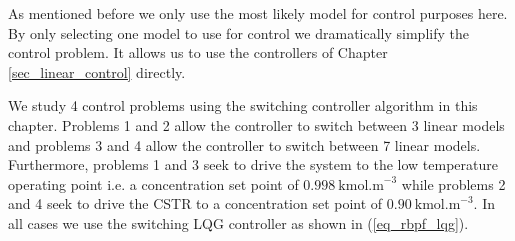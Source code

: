 As mentioned before we only use the most likely model for control purposes here. By only selecting one model to use for control we dramatically simplify the control problem. It allows us to use the controllers of Chapter \ref{sec_linear_control} directly. 

We study 4 control problems using the switching controller algorithm in this chapter. Problems 1 and 2 allow the controller to switch between 3 linear models and problems 3 and 4 allow the controller to switch between 7 linear models. Furthermore, problems 1 and 3 seek to drive the system to the low temperature operating point i.e. a concentration set point of $0.998~\text{kmol.m}^{-3}$ while problems 2 and 4 seek to drive the CSTR to a concentration set point of $0.90~\text{kmol.m}^{-3}$. In all cases we use the switching LQG controller as shown in (\ref{eq_rbpf_lqg}).

